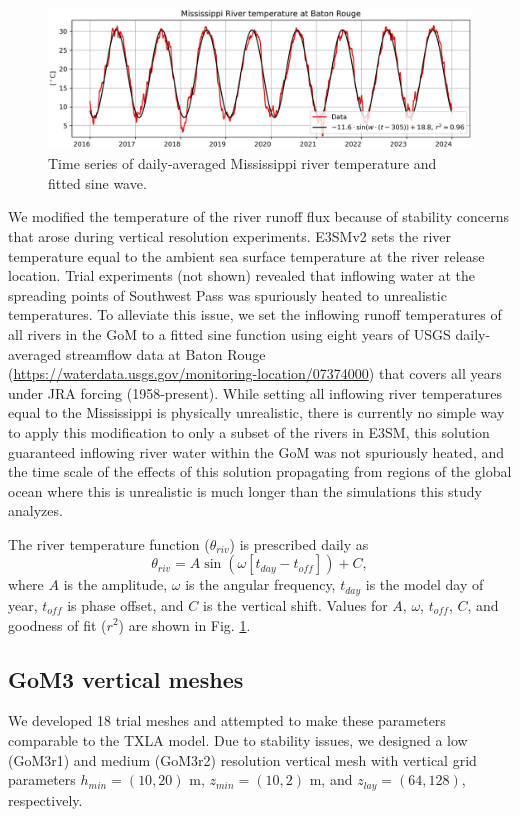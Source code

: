 \begin{figure}[t]
\centerline{\includegraphics[width=\textwidth]{figures/scgsr/Miss_temp.jpg}}
    \caption{Time series of daily-averaged Mississippi river temperature and fitted sine wave.}
    \label{fig:miss_temp}
\end{figure}

We modified the temperature of the river runoff flux because of stability concerns that arose during vertical resolution experiments. E3SMv2 sets the river temperature equal to the ambient sea surface temperature at the river release location. Trial experiments (not shown) revealed that inflowing water at the spreading points of Southwest Pass was spuriously heated to unrealistic temperatures. To alleviate this issue, we set the inflowing runoff temperatures of all rivers in the GoM to a fitted sine function using eight years of USGS daily-averaged streamflow data at Baton Rouge (\url{https://waterdata.usgs.gov/monitoring-location/07374000}) that covers all years under JRA forcing (1958-present). While setting all inflowing river temperatures equal to the Mississippi is physically unrealistic, there is currently no simple way to apply this modification to only a subset of the rivers in E3SM, this solution guaranteed inflowing river water within the GoM was not spuriously heated, and the time scale of the effects of this solution propagating from regions of the global ocean where this is unrealistic is much longer than the simulations this study analyzes. 

The river temperature function ($\theta_{riv}$) is prescribed daily as
\begin{equation}
    \theta_{riv} = A \sin (\omega [t_{day}-t_{off}] ) + C, 
\end{equation}
where $A$ is the amplitude, $\omega$ is the angular frequency, $t_{day}$ is the model day of year, $t_{off}$ is phase offset, and $C$ is the vertical shift. Values for $A$, $\omega$, $t_{off}$, $C$, and goodness of fit ($r^2$) are shown in Fig. \ref{fig:miss_temp}. 

\subsection{GoM3 vertical meshes}
We developed 18 trial meshes and attempted to make these parameters comparable to the TXLA model. Due to stability issues, we designed a low (GoM3r1) and medium (GoM3r2) resolution vertical mesh with vertical grid parameters $h_{min} = (10,20)$ m, $z_{min} = (10,2)$ m, and $z_{lay} = (64,128)$, respectively. 

